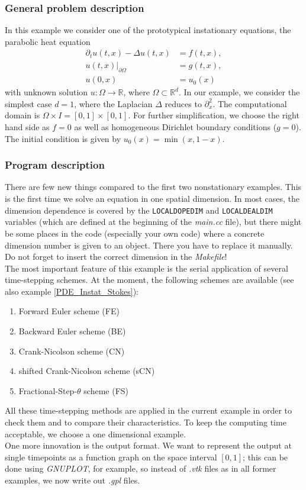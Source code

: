 \subsubsection{General problem description}

In this example we consider one of the prototypical instationary equations, the parabolic heat equation
\begin{align*}
\partial_t u(t,x) - \Delta u(t,x) &= f(t,x),\\
u(t,x)|_{\partial \Omega} &= g(t,x),\\
u(0,x) &= u_0(x)
\end{align*}
with unknown solution $u:\Omega \rightarrow \mathbb{R}$, where $\Omega \subset \mathbb{R}^d$. In our example, we consider the simplest case $d=1$, where the Laplacian $\Delta$ reduces to $\partial_x^2$. The computational domain is $\Omega \times I = [0,1] \times [0,1]$. For further simplification, we choose the right hand side as $f=0$ as well as homogeneous Dirichlet boundary conditions ($g=0$). The initial condition is given by $u_0(x) = \min(x,1-x)$.

\subsubsection{Program description}

There are few new things compared to the first two nonstationary examples. This is the first time we solve an equation in one spatial dimension. In most cases, the dimension dependence is covered by the \texttt{LOCALDOPEDIM} and \texttt{LOCALDEALDIM} variables (which are defined at the beginning of the \textit{main.cc} file), but there might be some places in the code (especially your own code) where a concrete dimension number is given to an object. There you have to replace it manually. Do not forget to insert the correct dimension in the \textit{Makefile}!\\
The most important feature of this example is the serial application of several time-stepping schemes. At the moment, the following schemes are available (see also example \ref{PDE_Instat_Stokes}):
\begin{enumerate}
\item
Forward Euler scheme (FE)
\item
Backward Euler scheme (BE)
\item
Crank-Nicolson scheme (CN)
\item
shifted Crank-Nicolson scheme (sCN)
\item
Fractional-Step-$\theta$ scheme (FS)
\end{enumerate}
All these time-stepping methods are applied in the current example in order to check them and to compare their characteristics. To keep the computing time acceptable, we choose a one dimensional example.\\
One more innovation is the output format. We want to represent the output at single timepoints as a function graph on the space interval $[0,1]$; this can be done using \textit{GNUPLOT}, for example, so instead of \textit{.vtk} files as in all former examples, we now write out \textit{.gpl} files.